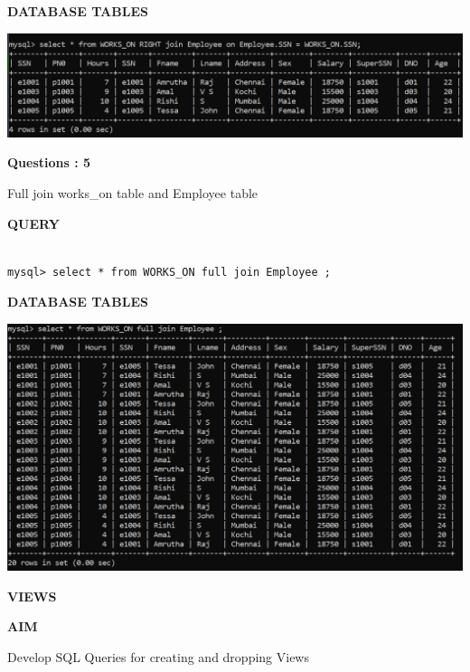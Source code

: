 \documentclass[a4paper,12pt]{report}
\begin{document}
\begin{flushleft}
		\textbf{DATABASE TABLES} 
\end{flushleft} 

\includegraphics[scale=0.4]{Screenshot (475).png}

\begin{flushleft}
    \textbf{Questions : 5}
\end{flushleft}

Full join works\_on table and Employee table

	\begin{flushleft}
		\textbf{QUERY }
	\end{flushleft}
 \begin{verbatim}
 
mysql> select * from WORKS_ON full join Employee ;

 \end{verbatim}
\begin{flushleft}
		\textbf{DATABASE TABLES} 
\end{flushleft} 

\includegraphics[scale=0.4]{Screenshot (477).png}
\newpage
\begin{center}
		\large\textbf{VIEWS}
	\end{center}
	
	\begin{flushleft}
		\textbf{AIM }
	\end{flushleft} 
	   Develop SQL Queries for creating and dropping Views
\end{document}
